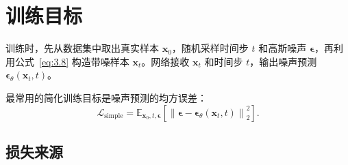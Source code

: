 \documentclass[UTF8,a4paper,12pt]{ctexart}
\numberwithin{equation}{section}
\begin{document}
\section{训练目标}

训练时，先从数据集中取出真实样本 $\bm{x}_0$，随机采样时间步 $t$ 和高斯噪声 $\bm{\epsilon}$，再利用公式~\eqref{eq:3.8} 构造带噪样本 $\bm{x}_t$。网络接收 $\bm{x}_t$ 和时间步 $t$，输出噪声预测 $\bm{\epsilon}_\theta(\bm{x}_t,t)$。

最常用的简化训练目标是噪声预测的均方误差：
\begin{equation}\label{eq:5.1}
\mathcal{L}_{\mathrm{simple}}
=\mathbb{E}_{\bm{x}_0,t,\bm{\epsilon}}
\left[\left\|\bm{\epsilon}-\bm{\epsilon}_\theta(\bm{x}_t,t)\right\|_2^2\right].
\end{equation}

\subsection{损失来源}
\end{document}
